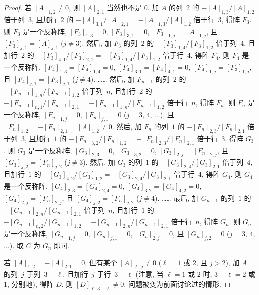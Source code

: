 \documentclass[../libro.tex]{subfiles}
\begin{document}
\begin{proof}
    若 \([A]_{1,2} \neq 0\),
    则 \([A]_{2,1}\) 当然也不是 \(0\).
    加 \(A\) 的列~\(2\) 的
    \(-[A]_{1,3}/[A]_{1,2}\)
    倍于列~\(3\),
    且加行~\(2\) 的
    \(-[A]_{3,1}/[A]_{2,1} = -[A]_{1,3}/[A]_{1,2}\)
    倍于行~\(3\), 得阵 \(F_3\).
    则 \(F_3\) 是一个反称阵,
    \([F_3]_{1,3} = 0\),
    \([F_3]_{3,1} = 0\),
    \([F_3]_{1,j} = [A]_{1,j}\),
    且 \([F_3]_{j,1} = [A]_{j,1}\)
    (\(j \neq 3\)).
    然后, 加 \(F_3\) 的列~\(2\) 的
    \(-[F_3]_{1,4}/[F_3]_{1,2}\)
    倍于列~\(4\),
    且加行~\(2\) 的
    \(-[F_3]_{4,1}/[F_3]_{2,1} = -[F_3]_{1,4}/[F_3]_{1,2}\)
    倍于行~\(4\), 得阵 \(F_4\).
    则 \(F_4\) 是一个反称阵,
    \([F_4]_{1,3} = [F_4]_{1,4} = 0\),
    \([F_4]_{3,1} = [F_4]_{4,1} = 0\),
    \([F_4]_{1,j} = [F_3]_{1,j}\),
    且 \([F_4]_{j,1} = [F_3]_{j,1}\)
    (\(j \neq 4\)).
    ……
    然后, 加 \(F_{n-1}\) 的列~\(2\) 的
    \(-[F_{n-1}]_{1,n}/[F_{n-1}]_{1,2}\)
    倍于列~\(n\),
    且加行~\(2\) 的
    \(-[F_{n-1}]_{n,1}/[F_{n-1}]_{2,1}
    = -[F_{n-1}]_{1,n}/[F_{n-1}]_{1,2}\)
    倍于行~\(n\), 得阵 \(F_n\).
    则 \(F_n\) 是一个反称阵,
    \([F_n]_{1,j} = 0\),
    \([F_n]_{j,1} = 0\)
    (\(j = 3\), \(4\), \(\dots\)),
    且 \([F_n]_{1,2} = -[F_n]_{2,1} = [A]_{1,2} \neq 0\).
    然后, 加 \(F_n\) 的列~\(1\) 的
    \(-[F_n]_{2,3}/[F_n]_{2,1}\)
    倍于列~\(3\),
    且加行~\(1\) 的
    \(-[F_n]_{3,2}/[F_n]_{1,2} = -[F_n]_{2,3}/[F_n]_{2,1}\)
    倍于行~\(3\), 得阵 \(G_3\).
    则 \(G_3\) 是一个反称阵,
    \([G_3]_{2,3} = 0\),
    \([G_3]_{3,2} = 0\),
    \([G_3]_{2,j} = [F_n]_{2,j}\),
    且 \([G_3]_{j,2} = [F_n]_{j,2}\)
    (\(j \neq 3\)).
    然后, 加 \(G_3\) 的列~\(1\) 的
    \(-[G_3]_{2,4}/[G_3]_{2,1}\)
    倍于列~\(4\),
    且加行~\(1\) 的
    \(-[G_3]_{4,2}/[G_3]_{1,2} = -[G_3]_{2,4}/[G_3]_{2,1}\)
    倍于行~\(4\), 得阵 \(G_4\).
    则 \(G_4\) 是一个反称阵,
    \([G_4]_{2,3} = [G_4]_{2,4} = 0\),
    \([G_4]_{3,2} = [G_4]_{4,2} = 0\),
    \([G_4]_{2,j} = [F_n]_{2,j}\),
    且 \([G_4]_{j,2} = [F_n]_{j,2}\)
    (\(j \neq 4\)).
    ……
    最后, 加 \(G_{n-1}\) 的列~\(1\) 的
    \(-[G_{n-1}]_{2,n}/[G_{n-1}]_{2,1}\)
    倍于列~\(n\),
    且加行~\(1\) 的
    \(-[G_{n-1}]_{n,2}/[G_{n-1}]_{1,2}
    = -[G_{n-1}]_{2,n}/[G_{n-1}]_{2,1}\)
    倍于行~\(n\), 得阵 \(G_n\).
    则 \(G_n\) 是一个反称阵,
    \([G_n]_{1,j} = 0\),
    \([G_n]_{j,1} = 0\),
    \([G_n]_{2,j} = 0\),
    且 \([G_n]_{j,2} = 0\)
    (\(j = 3\), \(4\), \(\dots\)).
    取 \(C\) 为 \(G_n\) 即可.

    若 \([A]_{1,2} = -[A]_{2,1} = 0\),
    但有某个 \([A]_{\ell,j} \neq 0\)
    (\(\ell = 1\) 或 \(2\),
    且 \(j > 2\)),
    加 \(A\) 的列~\(j\) 于列~\(3 - \ell\),
    且加行~\(j\) 于行~\(3 - \ell\)
    (注意, 当 \(\ell = 1\) 或 \(2\) 时,
    \(3 - \ell = 2\) 或 \(1\), 分别地),
    得阵 \(D\).
    则 \([D]_{\ell,3 - \ell} \neq 0\).
    问题被变为前面讨论过的情形.


\end{proof}
\end{document}
